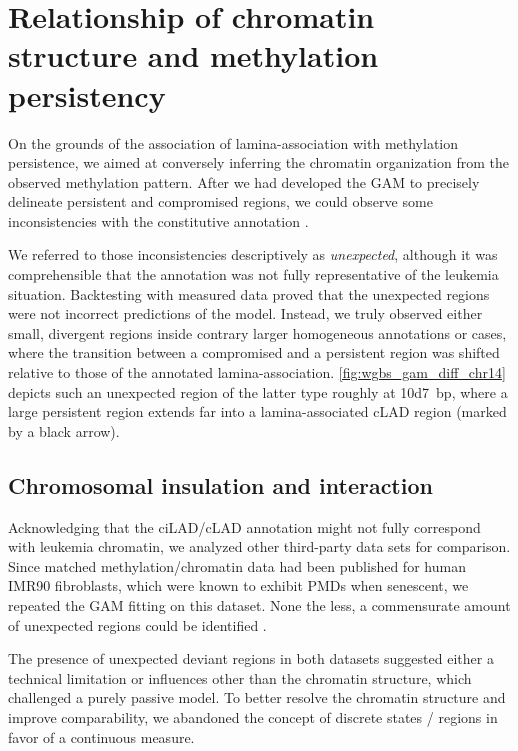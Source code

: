 \chapter{Relationship of chromatin structure and methylation persistency}
\label{chap:r:gam:chromatin}
\minitoc

On the grounds of the association of lamina-association with methylation persistence,  we aimed at conversely inferring the chromatin organization from the observed methylation pattern. After we had developed the GAM to precisely delineate persistent and compromised regions, we could observe some inconsistencies with the constitutive annotation	. 

We referred to those inconsistencies descriptively as \emph{unexpected}, although it was comprehensible that the annotation was not fully representative of the leukemia situation. Backtesting with measured data proved that the unexpected regions were not incorrect predictions of the model. Instead, we truly observed either small, divergent regions inside contrary larger homogeneous annotations or cases, where the transition between a compromised and a persistent region was shifted relative to those of the annotated lamina-association. \autoref{fig:wgbs_gam_diff_chr14} depicts such an unexpected region of the latter type roughly at \SI{10d7}{bp}, where a large persistent region extends far into a lamina-associated cLAD region (marked by a black arrow).

\section{Chromosomal insulation and interaction}
\label{chap:r:gam:chromatin:hic}

Acknowledging that the ciLAD/cLAD annotation might not fully correspond with \mllafnine leukemia chromatin, we analyzed other third-party data sets for comparison. Since matched methylation/chromatin data had been published for human IMR90 fibroblasts, which were known to exhibit PMDs when senescent\cite{Cruickshanks2013}, we repeated the GAM fitting on this dataset. None the less, a commensurate amount of unexpected regions could be identified \dns. 

The presence of unexpected deviant regions in both datasets suggested either a technical limitation or influences other than the chromatin structure, which challenged a purely passive model. To better resolve the chromatin structure and improve comparability, we abandoned the concept of discrete states / regions in favor of a continuous measure. 

